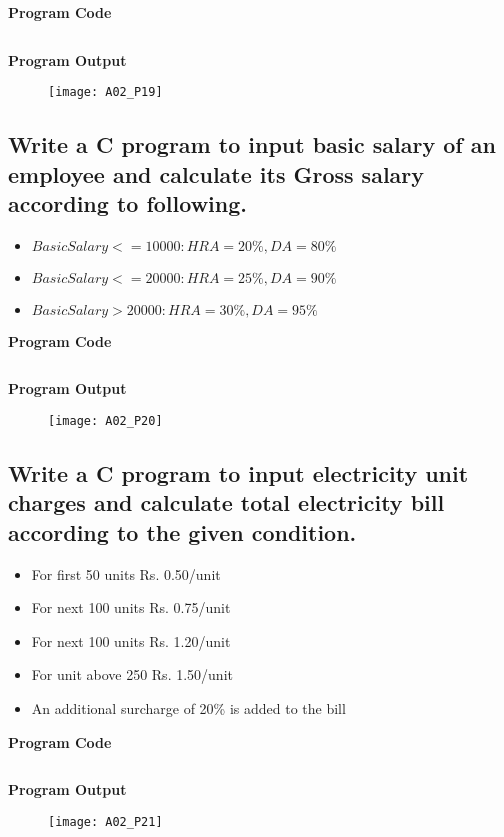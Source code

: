 \textbf{Program Code}
\inputminted[breaklines]{C}{programs/A02_P19.c}
\textbf{Program Output}
\begin{figure}[h]
  \texttt{[image: A02\_P19]}
\end{figure}
\pagebreak

\subsection{Write a C program to input basic salary of an employee and calculate its Gross salary according to following.}
\begin{itemize}
  \item $Basic Salary <= 10000 : HRA = 20\%, DA = 80\%$
  \item $Basic Salary <= 20000 : HRA = 25\%, DA = 90\%$
  \item $Basic Salary > 20000 : HRA = 30\%, DA = 95\%$
\end{itemize}
\textbf{Program Code}
\inputminted[breaklines]{C}{programs/A02_P20.c}
\textbf{Program Output}
\begin{figure}[h]
  \texttt{[image: A02\_P20]}
\end{figure}
\pagebreak


\subsection{Write a C program to input electricity unit charges and calculate total electricity bill according to the given condition.}
\begin{itemize}
  \item For first 50 units Rs. 0.50/unit
  \item For next 100 units Rs. 0.75/unit
  \item For next 100 units Rs. 1.20/unit
  \item For unit above 250 Rs. 1.50/unit
  \item An additional surcharge of 20\% is added to the bill
\end{itemize}
\textbf{Program Code}
\inputminted[breaklines]{C}{programs/A02_P21.c}
\textbf{Program Output}
\begin{figure}[h]
  \texttt{[image: A02\_P21]}
\end{figure}
\pagebreak

